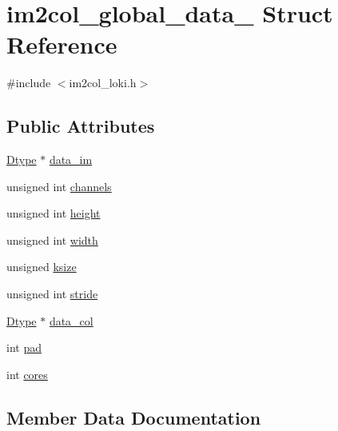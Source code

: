 \hypertarget{structim2col__global__data__}{}\section{im2col\+\_\+global\+\_\+data\+\_\+ Struct Reference}
\label{structim2col__global__data__}


{\ttfamily \#include $<$im2col\+\_\+loki.\+h$>$}

\subsection*{Public Attributes}
\begin{DoxyCompactItemize}
\item 
\hyperlink{setting_8h_a4cf883a2c584175fecfaeb45a2cd75e8}{Dtype} $\ast$ \hyperlink{structim2col__global__data___af708763a99e134c47b8f93bace607ec3}{data\+\_\+im}
\item 
unsigned int \hyperlink{structim2col__global__data___aac8868c1c8af06bfaa2fa30853d64fbc}{channels}
\item 
unsigned int \hyperlink{structim2col__global__data___a65e02e19112716613f1c96d67a8b9bd4}{height}
\item 
unsigned int \hyperlink{structim2col__global__data___af5d96d75182fe5e814ef1de4545a856f}{width}
\item 
unsigned \hyperlink{structim2col__global__data___a47c5f04fbc305bd5d649aef39994ba7d}{ksize}
\item 
unsigned int \hyperlink{structim2col__global__data___a8832dbb23824552fbfcfaeac820c5b1a}{stride}
\item 
\hyperlink{setting_8h_a4cf883a2c584175fecfaeb45a2cd75e8}{Dtype} $\ast$ \hyperlink{structim2col__global__data___a67a47fb38c11b4eeafdecf67d2419215}{data\+\_\+col}
\item 
int \hyperlink{structim2col__global__data___af3642914d12836e0b686b7ee1f18e7a6}{pad}
\item 
int \hyperlink{structim2col__global__data___abf2ce3e02a822749cf22c6063ec60ec8}{cores}
\end{DoxyCompactItemize}


\subsection{Member Data Documentation}
